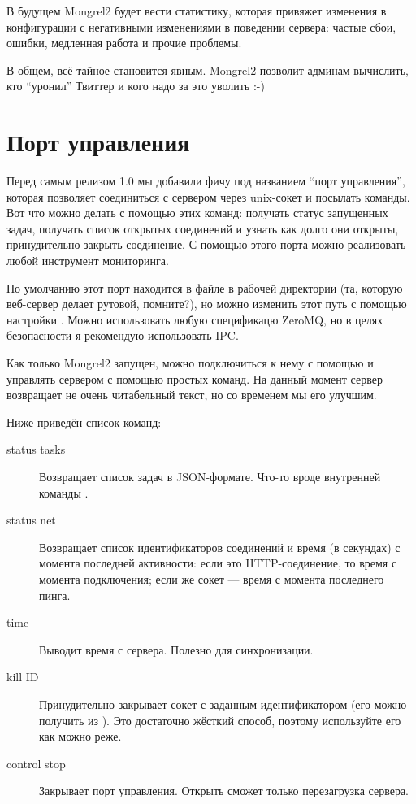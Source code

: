 В будущем Mongrel2 будет вести статистику, которая привяжет изменения
в конфигурации с негативными изменениями в поведении сервера: частые
сбои, ошибки, медленная работа и прочие проблемы.

В общем, всё тайное становится явным. Mongrel2 позволит админам
вычислить, кто ``уронил'' Твиттер и кого надо за это уволить :-)

\section{Порт управления}

Перед самым релизом 1.0 мы добавили фичу под названием ``порт
управления'', которая позволяет соединиться с сервером через unix-сокет
и посылать команды. Вот что можно делать с помощью этих команд:
получать статус запущенных задач, получать список открытых соединений
и узнать как долго они открыты, принудительно закрыть соединение. С
помощью этого порта можно реализовать любой инструмент мониторинга.

По умолчанию этот порт находится в файле  в рабочей
директории (та, которую веб-сервер делает рутовой, помните?), но можно
изменить этот путь с помощью настройки . Можно
использовать любую спецификацю ZeroMQ, но в целях безопасности я
рекомендую использовать IPC.

Как только Mongrel2 запущен, можно подключиться к нему с помощью
 и управлять сервером с помощью простых команд. На данный
момент сервер возвращает не очень читабельный текст, но со временем мы
его улучшим.

Ниже приведён список команд:

\begin{description}
\item[status tasks] Возвращает список задач в JSON-формате. Что-то вроде
    внутренней команды .
\item[status net] Возвращает список идентификаторов соединений и время
    (в секундах) с момента последней активности: если это HTTP-соединение,
    то время с момента подключения; если же сокет --- время с момента
    последнего пинга.
\item[time] Выводит время с сервера. Полезно для синхронизации.
\item[kill ID] Принудительно закрывает сокет с заданным
    идентификатором (его можно получить из ). Это
    достаточно жёсткий способ, поэтому используйте его как можно реже.
\item[control stop] Закрывает порт управления. Открыть сможет только
    перезагрузка сервера.
\end{description}

